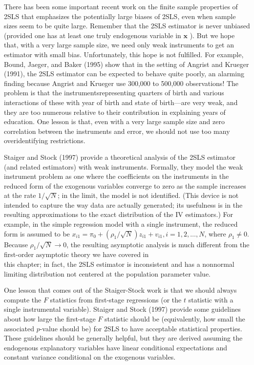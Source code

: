 \documentclass[10pt]{article}
\begin{document}
There has been some important recent work on the finite sample properties of 2SLS that emphasizes the potentially large biases of 2SLS, even when sample sizes seem to be quite large. Remember that the 2SLS estimator is never unbiased (provided one has at least one truly endogenous variable in $\mathbf{x}$ ). But we hope that, with a very large sample size, we need only weak instruments to get an estimator with small bias. Unfortunately, this hope is not fulfilled. For example, Bound, Jaeger, and Baker (1995) show that in the setting of Angrist and Krueger (1991), the 2SLS estimator can be expected to behave quite poorly, an alarming finding because Angrist and Krueger use 300,000 to 500,000 observations! The problem is that the instrumentsrepresenting quarters of birth and various interactions of these with year of birth and state of birth—are very weak, and they are too numerous relative to their contribution in explaining years of education. One lesson is that, even with a very large sample size and zero correlation between the instruments and error, we should not use too many overidentifying restrictions.

Staiger and Stock (1997) provide a theoretical analysis of the 2SLS estimator (and related estimators) with weak instruments. Formally, they model the weak instrument problem as one where the coefficients on the instruments in the reduced form of the exogenous variables converge to zero as the sample increases at the rate $1 / \sqrt{N}$; in the limit, the model is not identified. (This device is not intended to capture the way data are actually generated; its usefulness is in the resulting approximations to the exact distribution of the IV estimators.) For example, in the simple regression model with a single instrument, the reduced form is assumed to be $x_{i 1}=\pi_{0}+\left(\rho_{1} / \sqrt{N}\right) z_{i 1}+ v_{i 1}, i=1,2, \ldots, N$, where $\rho_{1} \neq 0$. Because $\rho_{1} / \sqrt{N} \rightarrow 0$, the resulting asymptotic analysis is much different from the first-order asymptotic theory we have covered in\\
this chapter; in fact, the 2SLS estimator is inconsistent and has a nonnormal limiting distribution not centered at the population parameter value.

One lesson that comes out of the Staiger-Stock work is that we should always compute the $F$ statistics from first-stage regressions (or the $t$ statistic with a single instrumental variable). Staiger and Stock (1997) provide some guidelines about how large the first-stage $F$ statistic should be (equivalently, how small the associated $p$-value should be) for 2SLS to have acceptable statistical properties. These guidelines should be generally helpful, but they are derived assuming the endogenous explanatory variables have linear conditional expectations and constant variance conditional on the exogenous variables.
\end{document}

